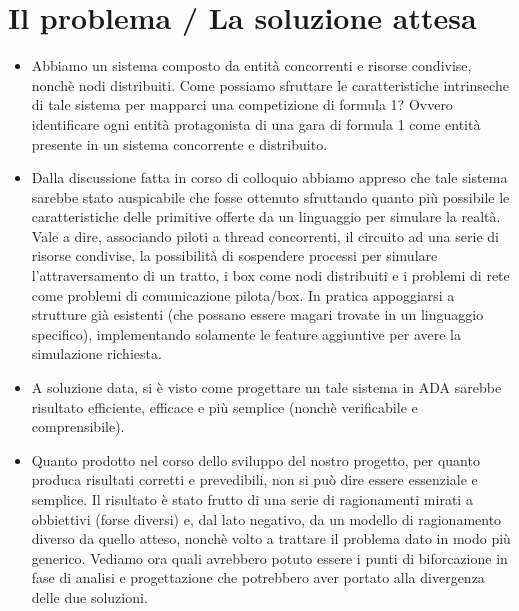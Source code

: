 \section{Il problema / La soluzione attesa}
\begin{itemize}
	\item Abbiamo un sistema composto da entità concorrenti e risorse condivise, nonchè nodi distribuiti. Come possiamo sfruttare le caratteristiche intrinseche di tale sistema per mapparci una competizione di formula 1? Ovvero identificare ogni entità protagonista di una gara di formula 1 come entità presente in un sistema concorrente e distribuito.
          \item Dalla discussione fatta in corso di colloquio abbiamo appreso che tale sistema sarebbe stato auspicabile che fosse ottenuto sfruttando quanto più possibile le caratteristiche delle primitive offerte da un linguaggio per simulare la realtà. Vale a dire, associando piloti a thread concorrenti, il circuito ad una serie di risorse condivise, la possibilità di sospendere processi per simulare l’attraversamento di un tratto, i box come nodi distribuiti e i problemi di rete come problemi di comunicazione pilota/box. In pratica appoggiarsi a strutture già esistenti (che possano essere magari trovate in un linguaggio specifico), implementando solamente le feature aggiuntive per avere la simulazione richiesta.
          \item A soluzione data, si è visto come progettare un tale sistema in ADA sarebbe risultato efficiente, efficace e più semplice (nonchè verificabile e comprensibile).
          \item Quanto prodotto nel corso dello sviluppo del nostro progetto, per quanto produca risultati corretti e prevedibili, non si può dire essere essenziale e semplice. Il risultato è stato frutto di una serie di ragionamenti mirati a obbiettivi (forse diversi) e, dal lato negativo, da un modello di ragionamento diverso da quello atteso, nonchè volto a trattare il problema dato in modo più generico. Vediamo ora quali avrebbero potuto essere i punti di biforcazione in fase di analisi e progettazione che potrebbero aver portato alla divergenza delle due soluzioni.
\end{itemize}